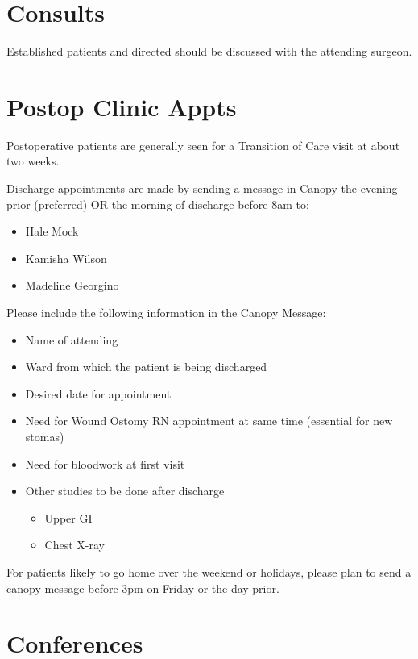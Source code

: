 \documentclass[
  letterpaper,
]{scrbook}
\providecommand{\tightlist}{%
  \setlength{\itemsep}{0pt}\setlength{\parskip}{0pt}}
\begin{document}
\section{Consults}\label{consults-1}

Established patients and directed should be discussed with the attending
surgeon.

\section{Postop Clinic Appts}\label{postop-clinic-appts}

Postoperative patients are generally seen for a Transition of Care visit
at about two weeks.

Discharge appointments are made by sending a message in Canopy the
evening prior (preferred) OR the morning of discharge before 8am to:

\begin{itemize}
\tightlist
\item
  Hale Mock
\item
  Kamisha Wilson
\item
  Madeline Georgino
\end{itemize}

Please include the following information in the Canopy Message:

\begin{itemize}
\tightlist
\item
  Name of attending
\item
  Ward from which the patient is being discharged
\item
  Desired date for appointment
\item
  Need for Wound Ostomy RN appointment at same time (essential for new
  stomas)
\item
  Need for bloodwork at first visit
\item
  Other studies to be done after discharge

  \begin{itemize}
  \tightlist
  \item
    Upper GI
  \item
    Chest X-ray
  \end{itemize}
\end{itemize}

For patients likely to go home over the weekend or holidays, please plan
to send a canopy message before 3pm on Friday or the day prior.

\section{Conferences}\label{conferences-1}
\end{document}
